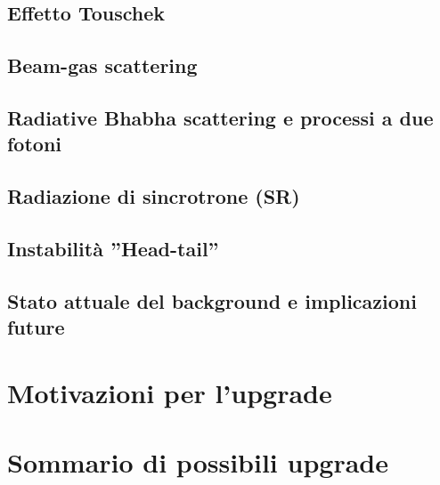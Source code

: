 \documentclass[10pt,a4paper,twoside]{report}
\begin{document}
\subsection{Effetto Touschek}

\subsection{Beam-gas scattering}

\subsection{Radiative Bhabha scattering e processi a due fotoni}

\subsection{Radiazione di sincrotrone (SR)}

\subsection{Instabilità ''Head-tail''}

\subsection{Stato attuale del background e implicazioni future}


\section{Motivazioni per l'upgrade}




\section{Sommario di possibili upgrade}
\end{document}
